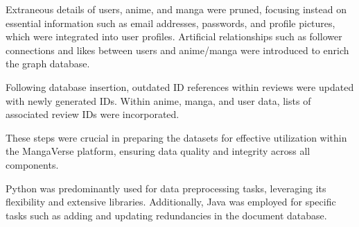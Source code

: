 \vspace{\baselineskip}

Extraneous details of users, anime, and manga were pruned, focusing instead on essential information such as email 
addresses, passwords, and profile pictures, which were integrated into user profiles. Artificial relationships such as follower 
connections and likes between users and anime/manga were introduced to enrich the graph database.

\vspace{\baselineskip}

Following database insertion, outdated ID references within reviews were updated with newly generated IDs. Within anime, manga, 
and user data, lists of associated review IDs were incorporated.

\vspace{\baselineskip}

These steps were crucial in preparing the datasets for effective utilization within the MangaVerse platform, 
ensuring data quality and integrity across all components.

\vspace{\baselineskip}

Python was predominantly used for data preprocessing tasks, leveraging its flexibility and extensive libraries. 
Additionally, Java was employed for specific tasks such as adding and updating redundancies in the document database.